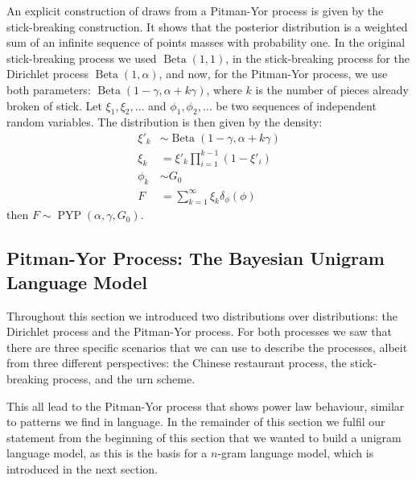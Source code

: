 An explicit construction of draws from a Pitman-Yor process is given by the stick-breaking construction. It shows that the posterior distribution is a weighted sum of an infinite sequence of points masses with probability one. In the original stick-breaking process we used $\operatorname{Beta}(1,1)$, in the stick-breaking process for the Dirichlet process $\operatorname{Beta}(1,\alpha)$, and now, for the Pitman-Yor process, we use both parameters: $\operatorname{Beta}(1-\gamma, \alpha+k\gamma)$, where $k$ is the number of pieces already broken of stick. Let $\xi_1,\xi_2,\ldots$ and $\phi_1, \phi_2,\ldots$ be two sequences of independent random variables. The distribution is then given by the density:
\begin{align}
	\xi'_k &\sim \operatorname{Beta}(1-\gamma, \alpha+k\gamma)\\
    \xi_k &= \xi'_k\prod_{i=1}^{k-1}(1-\xi'_i) \\
	\phi_k &\sim G_0 \\
	F &= \sum_{k=1}^\infty \xi_k \delta_\phi(\phi)
\end{align}
then $F\sim\operatorname{PYP}(\alpha, \gamma, G_0)$.

\subsection{Pitman-Yor Process: The Bayesian Unigram Language Model}
Throughout this section we introduced two distributions over distributions: the Dirichlet process and the Pitman-Yor process. For both processes we saw that there are three specific scenarios that we can use to describe the processes, albeit from three different perspectives: the Chinese restaurant process, the stick-breaking process, and the urn scheme.

This all lead to the Pitman-Yor process that shows power law behaviour, similar to patterns we find in language. In the remainder of this section we fulfil our statement from the beginning of this section that we wanted to build a unigram language model, as this is the basis for a $n$-gram language model, which is introduced in the next section.

